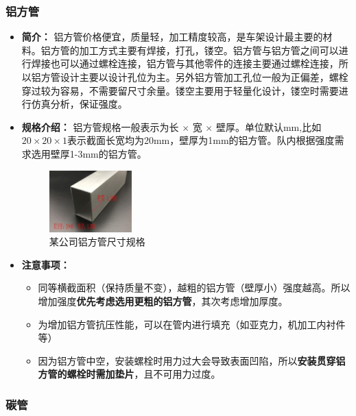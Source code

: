 \documentclass[UTF8]{article} %
\begin{document}
\subsubsection{铝方管}
\begin{itemize}
  \item \textbf{简介：} 铝方管价格便宜，质量轻，加工精度较高，是车架设计最主要的材料。铝方管的加工方式主要有焊接，打孔，镂空。铝方管与铝方管之间可以进行焊接也可以通过螺栓连接，铝方管与其他零件的连接主要通过螺栓连接，所以铝方管设计主要以设计孔位为主。另外铝方管加工孔位一般为正偏差，螺栓穿过较为容易，不需要留尺寸余量。镂空主要用于轻量化设计，镂空时需要进行仿真分析，保证强度。
  \item \textbf{规格介绍：} 铝方管规格一般表示为长 $\times$ 宽 $\times$ 壁厚。单位默认mm,比如$20 \times 20 \times 1$表示截面长宽均为20mm，壁厚为1mm的铝方管。队内根据强度需求选用壁厚1-3mm的铝方管。
  
  \begin{figure}[h]
    \centering
    \includegraphics[width=0.3\textwidth]{chicun1.jpg}
    \caption{某公司铝方管尺寸规格}
  \end{figure}

  \item \textbf{注意事项：} 
  
  \begin{itemize}
    \item 同等横截面积（保持质量不变），越粗的铝方管（壁厚小）强度越高。所以增加强度\textbf{优先考虑选用更粗的铝方管}，其次考虑增加厚度。
    \item 为增加铝方管抗压性能，可以在管内进行填充（如亚克力，机加工内衬件等）
    \item 因为铝方管中空，安装螺栓时用力过大会导致表面凹陷，所以\textbf{安装贯穿铝方管的螺栓时需加垫片}，且不可用力过度。
  \end{itemize}
\end{itemize}

\subsubsection{碳管}
\end{document}
